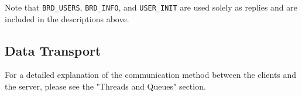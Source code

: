 Note that \texttt{BRD\_USERS}, \texttt{BRD\_INFO}, and \texttt{USER\_INIT} are used solely as replies and are included in the descriptions above.


\subsection{Data Transport}
For a detailed explanation of the communication method between the clients and the server, please see the "Threads and Queues" section.